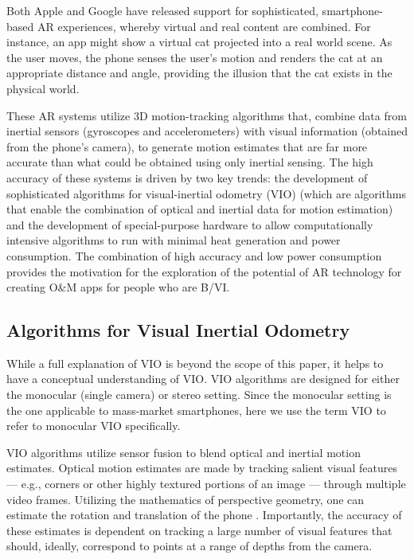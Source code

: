\documentclass[chi_draft]{sigchi}
\newcommand{\BVI}{B/VI\xspace}
\newcommand{\OM}{O\&M\xspace}
\begin{document}
Both Apple and Google have released support for sophisticated, smartphone-based AR experiences, whereby virtual and real content are combined.  For instance, an app might show a virtual cat projected into a real world scene.  As the user moves, the phone senses the user's motion and renders the cat at an appropriate distance and angle, providing the illusion that the cat exists in the physical world.

These AR systems utilize 3D motion-tracking algorithms that, combine data from inertial sensors (gyroscopes and accelerometers) with visual information (obtained from the phone's camera), to generate motion estimates that are far more accurate than what could be obtained using only inertial sensing.  The high accuracy of these systems is driven by two key trends: the development of sophisticated algorithms for visual-inertial odometry (VIO) \cite{li2013high,leutenegger2015keyframe,bloesch2015robust,forster2014svo} (which are algorithms that enable the combination of optical and inertial data for motion estimation) and the development of special-purpose hardware to allow computationally intensive algorithms to run with minimal heat generation and power consumption.  The combination of high accuracy and low power consumption provides the motivation for the exploration of the potential of AR technology for creating \OM apps for people who are \BVI.

\subsection{Algorithms for Visual Inertial Odometry}
While a full explanation of VIO \cite{gui2015review} is beyond the scope of this paper, it helps to have a conceptual understanding of VIO.  VIO algorithms are designed for either the monocular (single camera) or stereo setting.  Since the monocular setting is the one applicable to mass-market smartphones, here we use the term VIO to refer to monocular VIO specifically.

VIO algorithms utilize sensor fusion to blend optical and inertial motion estimates.  Optical motion estimates are made by tracking salient visual features --- e.g., corners or other highly textured portions of an image --- through multiple video frames.  Utilizing the mathematics of perspective geometry, one can estimate the rotation and translation of the phone \cite{Hartley2004}.  Importantly, the accuracy of these estimates is dependent on tracking a large number of visual features that should, ideally, correspond to points at a range of depths from the camera.%
\end{document}
